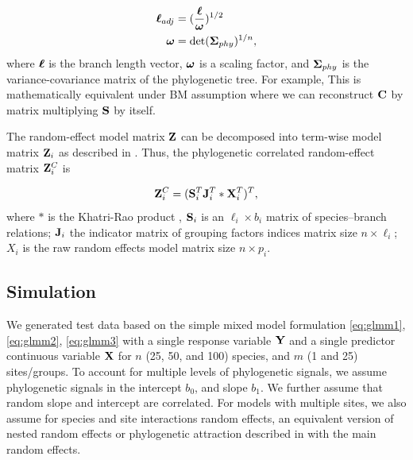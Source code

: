 
\begin{align}
{\boldsymbol \ell}_{adj} & = (\frac{{\boldsymbol \ell}}{{\boldsymbol \omega}})^{1/2} \\
{\boldsymbol \omega} & = \textrm{det}({\boldsymbol \Sigma}_{phy})^{1/n},
\end{align}
where ${\boldsymbol \ell}$ is the branch length vector, ${\boldsymbol \omega}$ is a scaling factor, and ${\boldsymbol \Sigma}_{phy}$ is the variance-covariance matrix of the phylogenetic tree.
For example, 
This is mathematically equivalent under BM assumption where we can reconstruct ${\mathbf C}$ by matrix multiplying ${\mathbf S}$ by itself.

The random-effect model matrix ${\mathbf Z}$ can be decomposed into term-wise model matrix ${\mathbf Z}_{i}$ as described in \citet{bates2015fitting}.
Thus, the phylogenetic correlated random-effect matrix ${\mathbf Z}^{C}_{i}$ is

\begin{equation}
{\mathbf Z}^{C}_{i} = ({\mathbf S}^{T}_{i}{\mathbf J}^{T}_{i} \ast {\mathbf X}^{T}_{i})^{T}, \label{eq:ZC}
\end{equation}
where $\ast$ is the Khatri-Rao product \citep{khatri1968solutions}, ${\mathbf S}_{i}$ is an $\ell_{i} \times b_{i}$ matrix of species--branch relations; ${\mathbf J}_{i}$ the indicator matrix of grouping factors indices matrix size $n \times \ell_{i}$; $X_{i}$ is the raw random effects model matrix size $n \times p_{i}$. 

\subsection{Simulation}

We generated test data based on the simple mixed model formulation \ref{eq:glmm1}, \ref{eq:glmm2}, \ref{eq:glmm3} with a single response variable ${\mathbf Y}$ and a single predictor continuous variable ${\mathbf X}$ for $n$ (25, 50, and 100) species, and $m$ (1 and 25) sites/groups. 
To account for multiple levels of phylogenetic signals, we assume phylogenetic signals in the intercept $b_0$, and slope $b_1$. 
We further assume that random slope and intercept are correlated. 
For models with multiple sites, we also assume for species and site interactions random effects, an equivalent version of nested random effects or phylogenetic attraction described in \cite{helmus2007separating} with the main random effects.

